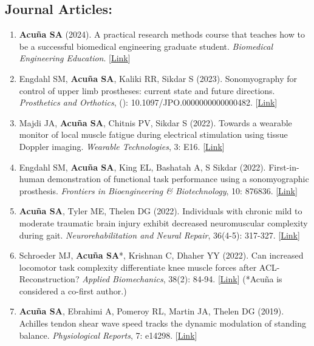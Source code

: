 \documentclass[letterpaper, 10pt]{article}
\begin{document}
\subsection{Journal Articles:}
\begin{enumerate}
    \item \textbf{Acuña SA} (2024). A practical research methods course that teaches how to be a successful biomedical engineering graduate student. \textit{Biomedical Engineering Education}. [\href{https://link.springer.com/article/10.1007/s43683-024-00135-9}{Link}]
    \item Engdahl SM, \textbf{Acuña SA}, Kaliki RR, Sikdar S (2023). Sonomyography for control of upper limb prostheses: current state and future directions. \textit{Prosthetics and Orthotics}, (): 10.1097/JPO.0000000000000482. [\href{https://journals.lww.com/jpojournal/fulltext/9900/sonomyography_for_control_of_upper_limb.44.aspx}{Link}]
    \item Majdi JA, \textbf{Acuña SA}, Chitnis PV, Sikdar S (2022). Towards a wearable monitor of local muscle fatigue during electrical stimulation using tissue Doppler imaging. \textit{Wearable Technologies}, 3: E16. [\href{https://www.cambridge.org/core/journals/wearable-technologies/article/toward-a-wearable-monitor-of-local-muscle-fatigue-during-electrical-muscle-stimulation-using-tissue-doppler-imaging/4ADA49B3A98D245E222D5CCFDE1F180D}{Link}]
    \item Engdahl SM, \textbf{Acuña SA}, King EL, Bashatah A, S Sikdar (2022). First-in-human demonstration of functional task performance using a sonomyographic prosthesis. \textit{Frontiers in Bioengineering \& Biotechnology}, 10: 876836. [\href{https://www.frontiersin.org/articles/10.3389/fbioe.2022.876836/full}{Link}]
    \item \textbf{Acuña SA}, Tyler ME, Thelen DG (2022). Individuals with chronic mild to moderate traumatic brain injury exhibit decreased neuromuscular complexity during gait. \textit{Neurorehabilitation and Neural Repair}, 36(4-5): 317-327. [\href{https://journals.sagepub.com/doi/full/10.1177/15459683221081064}{Link}]
    \item Schroeder MJ, \textbf{Acuña SA}*, Krishnan C, Dhaher YY (2022). Can increased locomotor task complexity differentiate knee muscle forces after ACL-Reconstruction? \textit{Applied Biomechanics}, 38(2): 84-94. [\href{https://journals.humankinetics.com/view/journals/jab/38/2/article-p84.xml}{Link}] (*Acuña is considered a co-ﬁrst author.)
    \item \textbf{Acuña SA}, Ebrahimi A, Pomeroy RL, Martin JA, Thelen DG (2019). Achilles tendon shear wave speed tracks the dynamic modulation of standing balance. \textit{Physiological Reports}, 7: e14298. [\href{https://physoc.onlinelibrary.wiley.com/doi/full/10.14814/phy2.14298}{Link}]

\end{enumerate}
\end{document}
